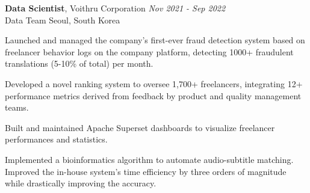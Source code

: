 \textbf{Data Scientist}, Voithru Corporation \hfill \textsl{Nov 2021 - Sep 2022}\\
Data Team \hfill Seoul, South Korea

\begin{list2}
    \item {Launched and managed the company's first-ever fraud detection system based on freelancer behavior logs on the company platform, detecting 1000+ fraudulent translations (5-10\% of total) per month.}
    \item {Developed a novel ranking system to oversee 1,700+ freelancers, integrating 12+ performance metrics derived from feedback by product and quality management teams.}
    \item {Built and maintained Apache Superset dashboards to visualize freelancer performances and statistics.}
    \item {Implemented a bioinformatics algorithm to automate audio-subtitle matching. Improved the in-house system's time efficiency by three orders of magnitude while drastically improving the accuracy.}
\end{list2}